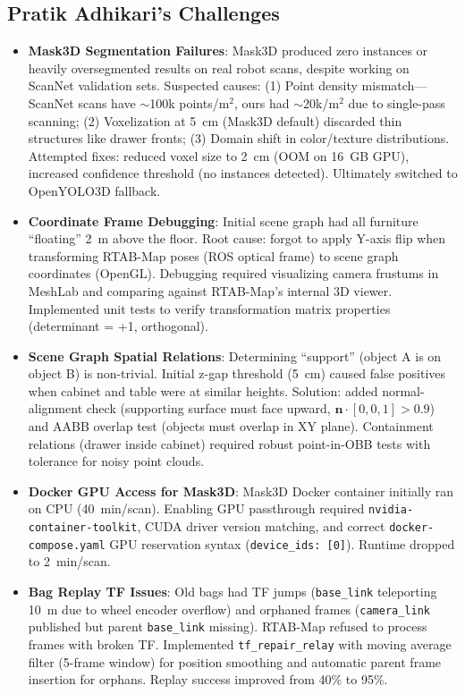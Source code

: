 \documentclass[12pt,oneside,a4paper]{article}
\begin{document}
\subsection{Pratik Adhikari's Challenges}
\begin{itemize}
    \item \textbf{Mask3D Segmentation Failures}: Mask3D produced zero instances or heavily oversegmented results on real robot scans, despite working on ScanNet validation sets. Suspected causes: (1) Point density mismatch---ScanNet scans have $\sim$100k points/m$^2$, ours had $\sim$20k/m$^2$ due to single-pass scanning; (2) Voxelization at 5~cm (Mask3D default) discarded thin structures like drawer fronts; (3) Domain shift in color/texture distributions. Attempted fixes: reduced voxel size to 2~cm (OOM on 16~GB GPU), increased confidence threshold (no instances detected). Ultimately switched to OpenYOLO3D fallback.
    
    \item \textbf{Coordinate Frame Debugging}: Initial scene graph had all furniture ``floating'' 2~m above the floor. Root cause: forgot to apply Y-axis flip when transforming RTAB-Map poses (ROS optical frame) to scene graph coordinates (OpenGL). Debugging required visualizing camera frustums in MeshLab and comparing against RTAB-Map's internal 3D viewer. Implemented unit tests to verify transformation matrix properties (determinant = +1, orthogonal).
    
    \item \textbf{Scene Graph Spatial Relations}: Determining ``support'' (object A is on object B) is non-trivial. Initial z-gap threshold (5~cm) caused false positives when cabinet and table were at similar heights. Solution: added normal-alignment check (supporting surface must face upward, $\mathbf{n} \cdot [0,0,1] > 0.9$) and AABB overlap test (objects must overlap in XY plane). Containment relations (drawer inside cabinet) required robust point-in-OBB tests with tolerance for noisy point clouds.
    
    \item \textbf{Docker GPU Access for Mask3D}: Mask3D Docker container initially ran on CPU (40~min/scan). Enabling GPU passthrough required \texttt{nvidia-container-toolkit}, CUDA driver version matching, and correct \texttt{docker-compose.yaml} GPU reservation syntax (\texttt{device\_ids: [0]}). Runtime dropped to 2~min/scan.
    
    \item \textbf{Bag Replay TF Issues}: Old bags had TF jumps (\texttt{base\_link} teleporting 10~m due to wheel encoder overflow) and orphaned frames (\texttt{camera\_link} published but parent \texttt{base\_link} missing). RTAB-Map refused to process frames with broken TF. Implemented \texttt{tf\_repair\_relay} with moving average filter (5-frame window) for position smoothing and automatic parent frame insertion for orphans. Replay success improved from 40\% to 95\%.
    

\end{itemize}
\end{document}
